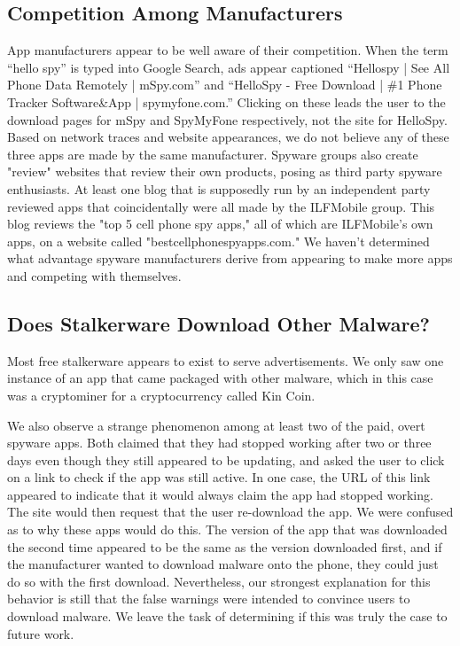 \documentclass[acmtog]{acmart}
\begin{document}
\subsection{Competition Among Manufacturers}

App manufacturers appear to be well aware of their competition. When the term 
``hello spy'' is typed into Google Search, ads appear captioned ``Hellospy | 
See All Phone Data Remotely | mSpy.com'' and ``HelloSpy - Free Download | \#1 
Phone Tracker Software\&App | spymyfone.com.'' Clicking on these leads the user 
to the download pages for mSpy and SpyMyFone respectively, not the site for 
HelloSpy. Based on network traces and website appearances, we do not believe 
any of these three apps are made by the same manufacturer. Spyware groups also 
create "review" websites that review their own products, posing as third party 
spyware enthusiasts. At least one blog that is supposedly run by 
an independent party reviewed apps that coincidentally were all made by the 
ILFMobile group\cite{noauthor_best_nodate}. This blog reviews the 
"top 5 cell phone spy apps," all of which are ILFMobile's own apps, on a 
website called "bestcellphonespyapps.com." We haven't determined what advantage 
spyware manufacturers derive from appearing to make more apps and competing 
with themselves.

\subsection{Does Stalkerware Download Other Malware?}

Most free stalkerware appears to exist to serve advertisements. We only saw one 
instance of an app that came packaged with other malware, which in this case 
was a cryptominer for a cryptocurrency called Kin Coin.

We also observe a strange phenomenon among at least two of the paid, overt 
spyware apps. Both claimed that they had stopped working after two or three 
days even though they still appeared to be updating, and asked the user to 
click on a link to check if the app was still active. In one case, the URL of 
this link appeared to indicate that it would always claim the app had stopped 
working. The site would then request that the user re-download the app. We were 
confused as to why these apps would do this. 
The version of the app that was downloaded the second time appeared to be the 
same as the version downloaded first, and if the manufacturer wanted to 
download malware onto the phone, they could just do so with the first 
download. Nevertheless, our strongest explanation for this behavior is still 
that the false warnings were intended to convince users to download malware. We 
leave the task of determining if this was truly the case to future work.
\end{document}
